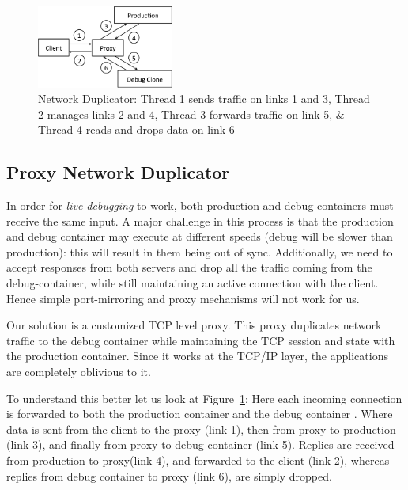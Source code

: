\begin{figure}[ht]
  \begin{centering}
    \includegraphics[width=0.4\textwidth]{figs/network_dup.pdf}
    \caption{Network Duplicator: Thread 1 sends traffic on links 1 and 3, Thread 2 manages links 2 and 4, Thread 3 forwards traffic on link 5, \& Thread 4 reads and drops data on link 6}
    \label{fig:duplicator}
  \end{centering}
\end{figure}

\subsection{Proxy Network Duplicator} 
\label{sec:proxyDuplicator}



In order for \textit{live debugging} to work, both production and debug containers must receive the same input.
A major challenge in this process is that the production and debug container may execute at different speeds (debug will be slower than production): this will result in them being out of sync.
Additionally, we need to accept responses from both servers and drop all the traffic coming from the debug-container, while still maintaining an active connection with the client.
Hence simple port-mirroring and proxy mechanisms will not work for us.

Our solution is a customized TCP level proxy. 
This proxy duplicates network traffic to the debug container while maintaining the TCP session and state with the production container. 
Since it works at the TCP/IP layer, the applications are completely oblivious to it.

To understand this better let us look at Figure~\ref{fig:duplicator}: Here each incoming connection is forwarded to both the production container and the debug container . 
Where data is sent from the client to the proxy (link 1), then from proxy to production (link 3), and finally from proxy to debug container (link 5). 
Replies are received from production to proxy(link 4), and forwarded to the client (link 2), whereas replies from debug container to proxy (link 6), are simply dropped. 

